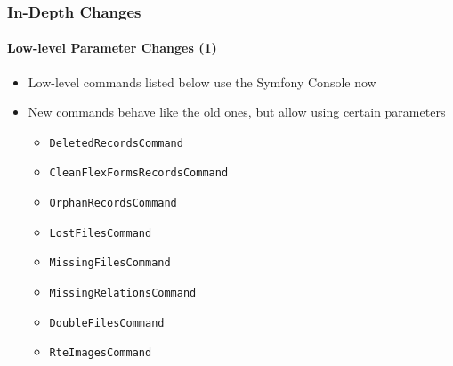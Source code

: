 \begin{frame}[fragile]
	\frametitle{In-Depth Changes}
	\framesubtitle{Low-level Parameter Changes (1)}


	\begin{itemize}
		\item Low-level commands listed below use the Symfony Console now
		\item New commands behave like the old ones, but allow using certain parameters

			\begin{itemize}
				\item \texttt{DeletedRecordsCommand}
				\item \texttt{CleanFlexFormsRecordsCommand}
				\item \texttt{OrphanRecordsCommand}
				\item \texttt{LostFilesCommand}
				\item \texttt{MissingFilesCommand}
				\item \texttt{MissingRelationsCommand}
				\item \texttt{DoubleFilesCommand}
				\item \texttt{RteImagesCommand}
			\end{itemize}

	\end{itemize}

\end{frame}

